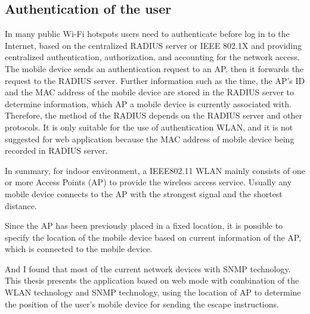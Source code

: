 \subsection{Authentication of the user}

In many public Wi-Fi hotspots users need to authenticate before log in to the Internet, based on the centralized RADIUS server or IEEE 802.1X and providing centralized authentication, authorization, and accounting for the network access. The mobile device sends an authentication request to an AP, then it forwards the request to the RADIUS server. Further information such as the time, the AP's ID and the MAC address of the mobile device are stored in the RADIUS server to determine information, which AP a mobile device is currently associated with. Therefore, the method of the RADIUS depends on the RADIUS server and other protocols. It is only suitable for the use of authentication WLAN, and it is not suggested for web application because the MAC address of mobile device being recorded in RADIUS server.        

In summary, for indoor environment, a IEEE802.11 WLAN mainly consists of one or more Access Points (AP) to provide the wireless access service. Usually any mobile device connects to the AP with the strongest signal and the shortest distance.

Since the AP has been previously placed in a fixed location, it is possible to specify the location of the mobile device based on current information of the AP, which is connected to the mobile device. 

And I found that most of the current network devices with SNMP technology. This thesis presents the application based on web mode with combination of the WLAN technology and SNMP technology, using the location of AP to determine the position of the user's mobile device for sending the escape instructions.

